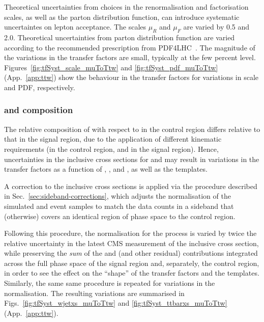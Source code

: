 Theoretical uncertainties from choices in the renormalisation and
factorisation scales, as well as the parton distribution function, can
introduce systematic uncertaintes on lepton acceptance. The scales
$\mu_R$ and $\mu_F$ are varied by 0.5 and 2.0. Theoretical
uncertainties from parton distribution function are varied according
to the recommended prescription from PDF4LHC~\cite{PDF4LHC:2015}. The
magnitude of the variations in the transfer factors are small,
typically at the few percent
level. Figures~\ref{fig:tfSyst_scale_muToTtw} and
\ref{fig:tfSyst_pdf_muToTtw} (App.~\ref{app:ttw}) show the behaviour
in the transfer factors for variations in scale and PDF, respectively.

\subsubsection{\texorpdfstring{\wj}{W+jets} and \texorpdfstring{\ttbar}{TTbar} composition}
\label{sec:tfSyst_ttW_composition}

The relative composition of \wj with respect to \ttbar in the \mj
control region differs relative to that in the signal region, due to
the application of different kinematic requirements (\eg \mt in the
control region, \alphat and \bdphi in the signal region). Hence,
uncertainties in the inclusive cross sections for \wj and \ttbar may
result in variations in the transfer factors as a function of \njet,
\scalht, and \nb, as well as the \HTmiss templates.

A correction to the inclusive cross sections is applied via the
procedure described in Sec.~\ref{sec:sideband-corrections}, which
adjusts the normalisation of the simulated \wj and \ttbar event
samples to match the data counts in a \HTmiss sideband that
(otherwise) covers an identical region of phase space to the \mj
control region.

Following this procedure, the normalisation for the \wj process is
varied by twice the relative uncertainty in the latest CMS measurement
of the inclusive cross section, while preserving the {\it sum} of the
\wj and \ttbar (and other residual) contributions integrated across
the full phase space of the signal region and, separately, the \mj
control region, in order to see the effect on the ``shape'' of the
transfer factors and the \HTmiss templates. Similarly, the same same
procedure is repeated for variations in the \ttbar normalisation. The
resulting variations are summarised in
Figs.~\ref{fig:tfSyst_wjetxs_muToTtw} and
\ref{fig:tfSyst_ttbarxs_muToTtw} (App.~\ref{app:ttw}). 

